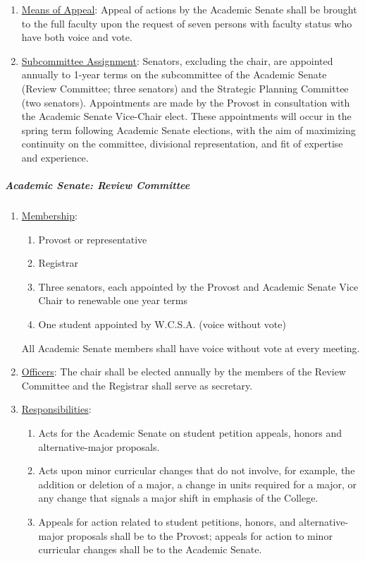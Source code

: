 \begin{enumerate}[label=\alph*)]
{\begin{enumerate}[label=\arabic*)]
							\end{enumerate}
						}
						\item{\underline{Means of Appeal}:  Appeal of actions by the Academic Senate shall be brought to the full faculty upon the request of seven persons with faculty status who have both voice and vote.}
						\item{\underline{Subcommittee Assignment}:  Senators, excluding the chair, are appointed annually to 1-year terms on the subcommittee of the Academic Senate (Review Committee; three senators) and the Strategic Planning Committee (two senators).  Appointments are made by the Provost in consultation with the Academic Senate Vice-Chair elect.  These appointments will occur in the spring term following Academic Senate elections, with the aim of maximizing continuity on the committee, divisional representation, and fit of expertise and experience.}
					\end{enumerate}
				\subparagraph{Academic Senate:  Review Committee}
					\begin{enumerate}[label=\alph*)]
						\item{\underline{Membership}:
							\begin{enumerate}[label=\arabic*)]
								\item{Provost or representative}
								\item{Registrar}
								\item{Three senators, each appointed by the Provost and Academic Senate Vice Chair to renewable one year terms}
								\item{One student appointed by W.C.S.A. (voice without vote)}
							\end{enumerate}
							All Academic Senate members shall have voice without vote at every meeting.
						}
						\item{\underline{Officers}:
							The chair shall be elected annually by the members of the Review Committee and the Registrar shall serve as secretary.
						}
						\item{\underline{Responsibilities}:
							\begin{enumerate}[label=\arabic*)]
								\item{Acts for the Academic Senate on student petition appeals, honors and alternative-major proposals.}
								\item{Acts upon minor curricular changes that do not involve, for example, the addition or deletion of a major, a change in units required for a major, or any change that signals a major shift in emphasis of the College.}
								\item{Appeals for action related to student petitions, honors, and alternative-major proposals shall be to the Provost; appeals for action to minor curricular changes shall be to the Academic Senate.}
							\end{enumerate}
						}
					\end{enumerate}
